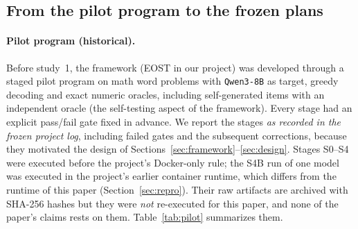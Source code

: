 \subsection{From the pilot program to the frozen plans}\label{sec:devhist}\label{sec:pilot}

\paragraph{Pilot program (historical).} Before study~1, the framework (EOST in our project) was developed through a staged pilot
program on math word problems with \texttt{Qwen3-8B} as target, greedy decoding
and exact numeric oracles, including self-generated items with an independent oracle
(the self-testing aspect of the framework). Every stage had an explicit pass/fail gate
fixed in advance. We report the stages \emph{as recorded in the frozen project log},
including failed gates and the subsequent corrections, because they motivated
the design of Sections~\ref{sec:framework}--\ref{sec:design}. Stages S0--S4 were
executed before the project's Docker-only rule; the S4B run of one model was executed in
the project's earlier container runtime, which differs from the runtime of this paper
(Section~\ref{sec:repro}). Their raw artifacts are archived with SHA-256 hashes but they
were \emph{not} re-executed for this paper, and none of the paper's claims rests on them.
Table~\ref{tab:pilot} summarizes them.

